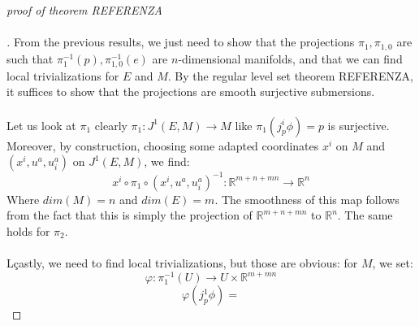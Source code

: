 \documentclass[12pt,a4paper]{report}
\theoremstyle{definition}
\theoremstyle{Theorem}
\theoremstyle{definition}
\theoremstyle{definition}
\begin{document}
	\begin{proof}[proof of theorem REFERENZA\\\\]
		From the previous results, we just need to show that the projections $\pi_1,\pi_{1,0}$ are such that $\pi_1^{-1}(p),\pi^{-1}_{1,0}(e)$ are $n$-dimensional manifolds, and that we can find local trivializations for $E$ and $M$. By the regular level set theorem REFERENZA, it suffices to show that the projections are smooth surjective submersions.\\\\
		Let us look at $\pi_1$ clearly $\pi_1:J^1(E,M)\rightarrow M$ like $\pi_1(j^i_p\phi)=p$ is surjective. Moreover, by construction, choosing some adapted coordinates $x^i$ on $M$ and $(x^i,u^a,u^a_i)$ on $J^1(E,M)$, we find:
		$$x^i\circ \pi_1 \circ (x^i,u^a,u^a_i)^{-1}:\mathbb{R}^{m+n+mn}\rightarrow \mathbb{R}^n$$
		Where $dim(M)=n$ and $dim(E)=m$. The smoothness of this map follows from the fact that this is simply the projection of $\mathbb{R}^{m+n+mn}$ to $\mathbb{R}^n$. The same holds for $\pi_2$.\\
		\\
		Lçastly, we need to find local trivializations, but those are obvious: for $M$, we set:
		$$\varphi:\pi_1^{-1}(U)\rightarrow U\times \mathbb{R}^{m+mn}$$
		$$\varphi(j^1_p\phi)=$$
	\end{proof}
	
\end{document}
